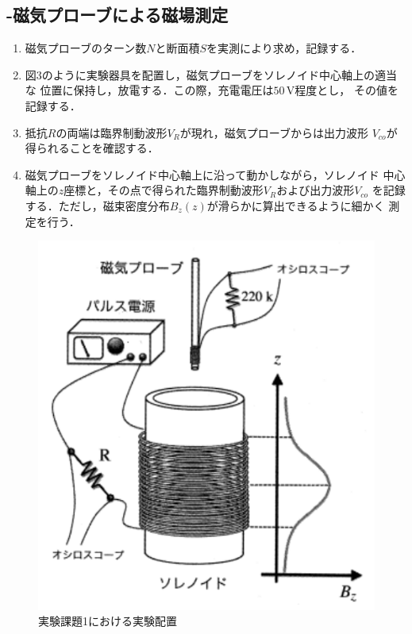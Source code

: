 \subsection{-磁気プローブによる磁場測定}
\begin{enumerate}
    \item 磁気プローブのターン数$N$と断面積$S$を実測により求め，記録する．
    \item 図3のように実験器具を配置し，磁気プローブをソレノイド中心軸上の適当な
    位置に保持し，放電する．この際，充電電圧は$50\,\si{\volt}$程度とし，
    その値を記録する．
    \item 抵抗$R$の両端は臨界制動波形$V_R$が現れ，磁気プローブからは出力波形
    $V_{co}$が得られることを確認する．
    \item 磁気プローブをソレノイド中心軸上に沿って動かしながら，ソレノイド
    中心軸上の$z$座標と，その点で得られた臨界制動波形$V_R$および出力波形$V_{co}$
    を記録する．ただし，磁束密度分布$B_z(z)$が滑らかに算出できるように細かく
    測定を行う．
\end{enumerate}
\begin{figure}[!ht]
    \centering
    \includegraphics[scale=1]{figure3.pdf}
    \caption{実験課題1における実験配置}
\end{figure}

